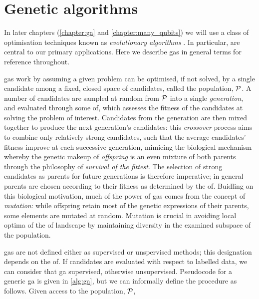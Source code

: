 \section{Genetic algorithms}\label{sec:genetic_algorithms}
In later chapters (\cref{chapter:ga} and \cref{chapter:many_qubits}) 
    we will use a class of optimisation techniques known as
    \emph{evolutionary algorithms} \cite{back1996evolutionary, de2020evolutionary}.
In particular, \emph{} are central to our primary applications.
Here we describe \glspl{ga} in general terms for reference throughout. 
\par 
\glspl{ga} work by assuming a given problem can be optimised, if not solved, by a single candidate 
    among a fixed, closed space of candidates, called the population, $\mathcal{P}$. 
A number of candidates are sampled at random from $\mathcal{P}$ into a single \emph{generation}, 
    and evaluated through some \acrfull{of}, which assesses the fitness of the candidates at solving the problem of interest. 
Candidates from the generation are then mixed together to produce the next generation's candidates: 
    this \emph{crossover} process aims to combine only relatively strong candidates, such that the average 
    candidates' fitness improve at each successive generation, 
    mimicing the biological mechanism whereby the genetic makeup of \emph{offspring} is an even mixture of both parents
    through the philosophy of \emph{survival of the fittest}. 
The selection of strong candidates as parents for future generations is therefore imperative; 
    in general parents are chosen according to their fitness as determined by the \gls{of}. 
Buidling on this biological motivation, much of the power of \glspl{ga} comes from the concept of \emph{mutation}: 
    while offspring retain most of the genetic expressions of their parents, some elements are mutated at random.
Mutation is crucial in avoiding local optima of the \gls{of} landscape
    by maintaining diversity in the examined subspace of the population.
\par 

\glspl{ga} are not defined either as supervised or unspervised methods;
    this designation depends on the \gls{of}. 
If candidates are evaluated with respect to labelled data, we can consider that \gls{ga} supervised, 
    otherwise unsupervised. 
Pseudocode for a generic \gls{ga} is given in \cref{alg:ga},
    but we can informally define the procedure as follows. 
Given access to the population, $\mathcal{P}$, 

